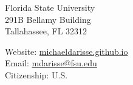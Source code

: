 \documentclass[letterpaper, 11pt]{article}
\begin{document}
\begin{center} \end{center} 

\bigskip
\begin{minipage}[t]{0.495\textwidth}
  Florida State University \\
  291B Bellamy Building \\
  Tallahassee, FL 32312
\end{minipage}
\begin{minipage}[t]{0.495\textwidth}
  Website: \href{https://michaeldarisse.github.io}{michaeldarisse.github.io} \\
  Email: \href{mailto:mdarisse@fsu.edu}{mdarisse@fsu.edu} \\
  Citizenship: U.S.
\end{minipage}

\setlength{\tabcolsep}{8pt}
\end{document}
